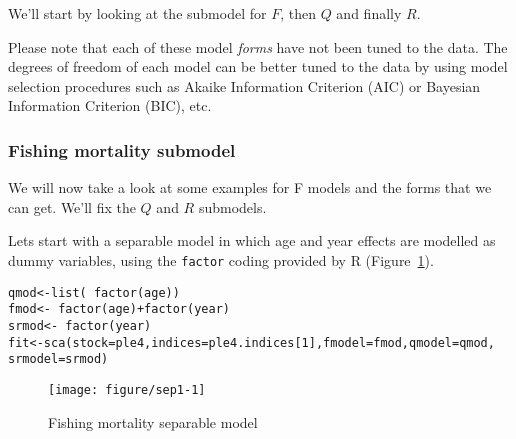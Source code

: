 \documentclass[a4paper,english,10pt]{article}\usepackage[]{graphicx}\usepackage[]{color}
\makeatletter
\def\maxwidth{ %
  \ifdim\Gin@nat@width>\linewidth
    \linewidth
  \else
    \Gin@nat@width
  \fi
}
\newcommand{\hlnum}[1]{\textcolor[rgb]{0.2,0.2,0.2}{#1}}%
\newcommand{\hlopt}[1]{\textcolor[rgb]{0.2,0.2,0.2}{#1}}%
\newcommand{\hlstd}[1]{\textcolor[rgb]{0,0,0}{#1}}%
\newcommand{\hlkwb}[1]{\textcolor[rgb]{0.361,0.506,0.596}{#1}}%
\newcommand{\hlkwc}[1]{\textcolor[rgb]{0.361,0.506,0.596}{#1}}%
\newcommand{\hlkwd}[1]{\textcolor[rgb]{0.361,0.506,0.596}{#1}}%
\newenvironment{kframe}{%
 \def\at@end@of@kframe{}%
 \ifinner\ifhmode%
  \def\at@end@of@kframe{\end{minipage}}%
  \begin{minipage}{\columnwidth}%
 \fi\fi%
 \def\FrameCommand##1{\hskip\@totalleftmargin \hskip-\fboxsep
 \colorbox{shadecolor}{##1}\hskip-\fboxsep
     \hskip-\linewidth \hskip-\@totalleftmargin \hskip\columnwidth}%
 \MakeFramed {\advance\hsize-\width
   \@totalleftmargin\z@ \linewidth\hsize
   \@setminipage}}%
 {\par\unskip\endMakeFramed%
 \at@end@of@kframe}
\newenvironment{knitrout}{}{} %
\newcommand{\code}[1]{{\texttt{#1}}}
\makeatother
\begin{document}
We'll start by looking at the submodel for $F$, then $Q$ and finally $R$.

Please note that each of these model \emph{forms} have not been tuned to the data. The degrees of freedom of each model can be better tuned to the data by using model selection procedures such as Akaike Information Criterion (AIC) or Bayesian Information Criterion (BIC), etc.

\subsubsection{Fishing mortality submodel}

We will now take a look at some examples for F models and the forms that we can get. We'll fix the $Q$ and $R$ submodels. 

Lets start with a separable model in which age and year effects are modelled as dummy variables, using the \code{factor} coding provided by R (Figure~\ref{fig:sep1}). 

\begin{knitrout}
\color{fgcolor}\begin{kframe}
\begin{alltt}
\hlstd{qmod} \hlkwb{<-} \hlkwd{list}\hlstd{(}\hlopt{~} \hlkwd{factor}\hlstd{(age))}
\hlstd{fmod} \hlkwb{<-} \hlopt{~} \hlkwd{factor}\hlstd{(age)} \hlopt{+} \hlkwd{factor}\hlstd{(year)}
\hlstd{srmod} \hlkwb{<-} \hlopt{~} \hlkwd{factor}\hlstd{(year)}
\hlstd{fit} \hlkwb{<-} \hlkwd{sca}\hlstd{(}\hlkwc{stock} \hlstd{= ple4,} \hlkwc{indices} \hlstd{= ple4.indices[}\hlnum{1}\hlstd{],} \hlkwc{fmodel}\hlstd{=fmod,} \hlkwc{qmodel}\hlstd{=qmod,}
           \hlkwc{srmodel}\hlstd{=srmod)}
\end{alltt}
\end{kframe}
\end{knitrout}

\begin{knitrout}
\color{fgcolor}\begin{figure}[H]

{\centering \texttt{[image: figure/sep1-1]} 

}

\caption[Fishing mortality separable model]{Fishing mortality separable model}\label{fig:sep1}
\end{figure}


\end{knitrout}
\end{document}
